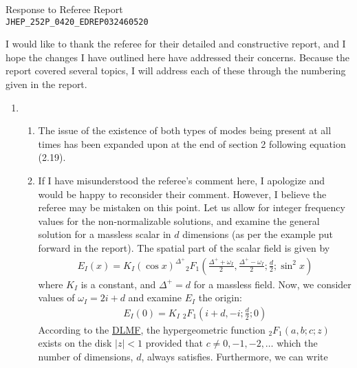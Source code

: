 \documentclass[11pt,letterpaper]{article}
\begin{document}
\vspace{.2in}
\begin{center}
    {\Large Response to Referee Report \\ \verb+JHEP_252P_0420_EDREP032460520+}  
\end{center}

\vspace{.25in}

I would like to thank the referee for their detailed and constructive
report, and I hope the changes I have outlined here have addressed their
concerns. Because the report covered several topics, I will address each
of these through the numbering given in the report.
\begin{enumerate}
    \item %
    \begin{enumerate}
        \item The issue of the existence of both types of modes being
        present at all times has been expanded upon at the end of section 2 
        following equation (2.19).
        \item If I have misunderstood the referee's comment here, I apologize and would be 
        happy to reconsider their comment. However, I believe the referee may be mistaken on this
        point. Let us allow for integer frequency values for the non-normalizable solutions,
        and examine the general solution for a massless scalar in $d$ dimensions (as 
        per the example put forward in the report). The spatial part of the scalar field
        is given by
        \begin{align}
            \label{e:NN function}
            E_I (x) = K_I \left( \cos x \right)^{\Delta^+} {_2}F_1 \left(\frac{\Delta^+ + \omega_I}{2}, \frac{\Delta^+ - \omega_I}{2}; \frac{d}{2}; \sin^2 x \right)
        \end{align}
        where $K_I$ is a constant, and $\Delta^+ = d$ for a massless field. Now, we
        consider values of $\omega_I = 2i + d$ and examine $E_I$ the origin:
        \begin{align}
            E_I(0) = K_I \; {_2}F_1 \left( i + d, -i; \frac{d}{2}; 0 \right)
        \end{align}
        According to the \href{https://dlmf.nist.gov/15.2}{DLMF}, the hypergeometric function
        ${_2}F_1 (a, b; c; z)$ exists on the disk $| z | < 1$ provided that $c \neq 0, -1, -2, \ldots$
        which the number of dimensions, $d$, always satisfies. Furthermore, we can write
        \begin{align}

\end{align}
\end{enumerate}
\end{enumerate}
\end{document}
